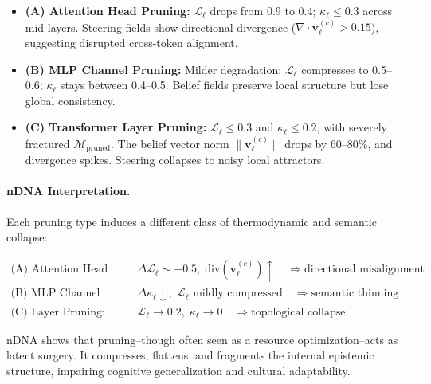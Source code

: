 \begin{itemize}[leftmargin=1.5em]
    \item \textbf{(A) Attention Head Pruning:} $\mathcal{L}_\ell$ drops from 0.9 to 0.4; $\kappa_\ell \leq 0.3$ across mid-layers. Steering fields show directional divergence ($\nabla \cdot \mathbf{v}_\ell^{(c)} > 0.15$), suggesting disrupted cross-token alignment.
    \item \textbf{(B) MLP Channel Pruning:} Milder degradation: $\mathcal{L}_\ell$ compresses to 0.5–0.6; $\kappa_\ell$ stays between 0.4–0.5. Belief fields preserve local structure but lose global consistency.
    \item \textbf{(C) Transformer Layer Pruning:} $\mathcal{L}_\ell \leq 0.3$ and $\kappa_\ell \leq 0.2$, with severely fractured $\mathcal{M}_{\text{pruned}}$. The belief vector norm $\|\mathbf{v}_\ell^{(c)}\|$ drops by 60--80\%, and divergence spikes. Steering collapses to noisy local attractors.
\end{itemize}

\paragraph{nDNA Interpretation.}
Each pruning type induces a different class of thermodynamic and semantic collapse:

\begin{align*}
    \text{(A) Attention Head Pruning:} \quad & \Delta \mathcal{L}_\ell \sim -0.5,\; \mathrm{div}(\mathbf{v}_\ell^{(c)}) \uparrow \quad \Rightarrow \text{directional misalignment} \\
    \text{(B) MLP Channel Pruning:} \quad & \Delta \kappa_\ell \downarrow,\; \mathcal{L}_\ell \text{ mildly compressed} \quad \Rightarrow \text{semantic thinning} \\
    \text{(C) Layer Pruning:} \quad & \mathcal{L}_\ell \rightarrow 0.2,\; \kappa_\ell \rightarrow 0 \quad \Rightarrow \text{topological collapse}
\end{align*}

nDNA shows that pruning--though often seen as a resource optimization--acts as latent surgery. It compresses, flattens, and fragments the internal epistemic structure, impairing cognitive generalization and cultural adaptability.






